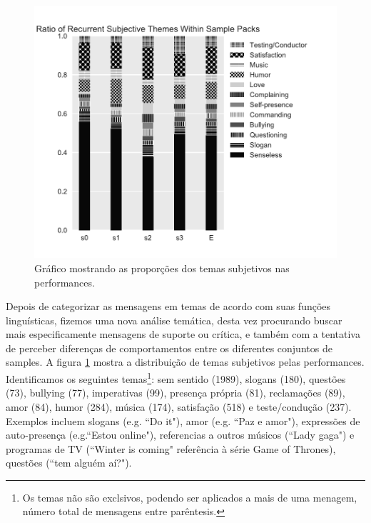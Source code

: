 \begin{figure}
\includegraphics[width=1\linewidth]{pictures/cap3/ratios_bw}
\caption{Gráfico mostrando as proporções dos temas subjetivos nas performances.}
\label{subj}
\end{figure}



Depois de categorizar as mensagens em temas de acordo com suas funções linguísticas, fizemos uma nova análise temática, desta vez procurando buscar mais especificamente mensagens de suporte ou crítica, e também com a tentativa de perceber diferenças de comportamentos entre os diferentes conjuntos de samples. A figura \ref{subj} mostra a distribuição de temas subjetivos pelas performances. Identificamos os seguintes temas\footnote{Os temas não são exclsivos, podendo ser aplicados a mais de uma menagem, número total de mensagens entre parêntesis.}: sem sentido (1989), slogans (180), questões (73), bullying (77), imperativas (99), presença própria (81), reclamações (89), amor (84), humor (284), música (174), satisfação (518) e teste/condução (237). Exemplos incluem slogans (e.g. ``Do it"), amor (e.g. ``Paz e amor"), expressões de auto-presença (e.g.``Estou online"), referencias a outros músicos (``Lady gaga") e programas de TV (``Winter is coming" referência à série Game of Thrones), questões (``tem alguém aí?"). 

